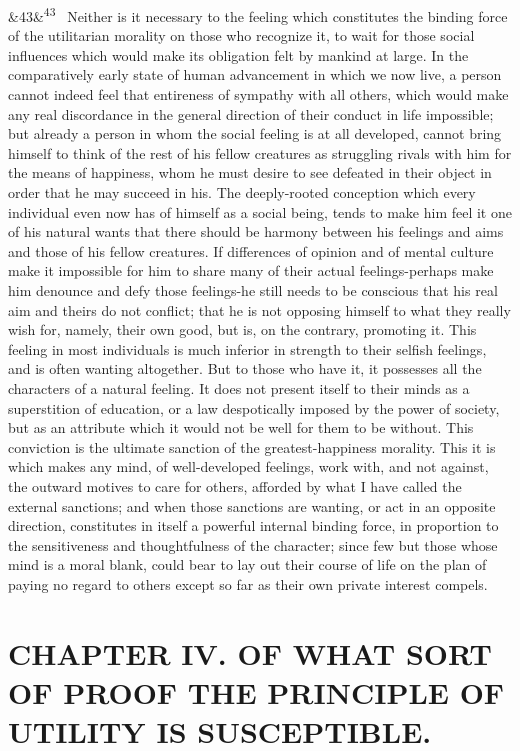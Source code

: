\documentclass[12pt]{article}
\newcommand{\para}[1][]{\par\noindent\ifx&#1&\else\textsuperscript{\footnotesize #1}~\fi}
\begin{document}
\para[43] Neither is it necessary to the feeling which constitutes the binding force of the utilitarian morality on those who recognize it, to wait for those social influences which would make its obligation felt by mankind at large. In the comparatively early state of human advancement in which we now live, a person cannot indeed feel that entireness of sympathy with all others, which would make any real discordance in the general direction of their conduct in life impossible; but already a person in whom the social feeling is at all developed, cannot bring himself to think of the rest of his fellow creatures as struggling rivals with him for the means of happiness, whom he must desire to see defeated in their object in order that he may succeed in his. The deeply-rooted conception which every individual even now has of himself as a social being, tends to make him feel it one of his natural wants that there should be harmony between his feelings and aims and those of his fellow creatures. If differences of opinion and of mental culture make it impossible for him to share many of their actual feelings-perhaps make him denounce and defy those feelings-he still needs to be conscious that his real aim and theirs do not conflict; that he is not opposing himself to what they really wish for, namely, their own good, but is, on the contrary, promoting it. This feeling in most individuals is much inferior in strength to their selfish feelings, and is often wanting altogether. But to those who have it, it possesses all the characters of a natural feeling. It does not present itself to their minds as a superstition of education, or a law despotically imposed by the power of society, but as an attribute which it would not be well for them to be without. This conviction is the ultimate sanction of the greatest-happiness morality. This it is which makes any mind, of well-developed feelings, work with, and not against, the outward motives to care for others, afforded by what I have called the external sanctions; and when those sanctions are wanting, or act in an opposite direction, constitutes in itself a powerful internal binding force, in proportion to the sensitiveness and thoughtfulness of the character; since few but those whose mind is a moral blank, could bear to lay out their course of life on the plan of paying no regard to others except so far as their own private interest compels.

\section*{CHAPTER IV. OF WHAT SORT OF PROOF THE PRINCIPLE OF UTILITY IS SUSCEPTIBLE.}
\end{document}
